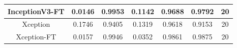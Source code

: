 \documentclass[11pt,a4paper]{article}
\theoremstyle{definition}
\begin{document}
\begin{table}[H]
\begin{tabular}{|c|c|c|c|c|c|c|}
\hline
InceptionV3-FT                                      & \textcolor[rgb]{0.129,0.129,0.129}{0.0146 } & \textcolor[rgb]{0.129,0.129,0.129}{0.9953 } & \textcolor[rgb]{0.129,0.129,0.129}{0.1142 }                                                                       & \textcolor[rgb]{0.129,0.129,0.129}{0.9688}                                                                             & \textcolor[rgb]{0.129,0.129,0.129}{0.9792}                                                                       & 20                                                                                                              \\
\hline
Xception                                            & \textcolor[rgb]{0.129,0.129,0.129}{0.1746 } & \textcolor[rgb]{0.129,0.129,0.129}{0.9405 } & \textcolor[rgb]{0.129,0.129,0.129}{0.1319 }                                                                       & \textcolor[rgb]{0.129,0.129,0.129}{0.9618}                                                                             & \textcolor[rgb]{0.129,0.129,0.129}{0.9153}                                                                       & 20                                                                                                              \\
\hline
\rowcolor{green} Xception-FT                        & \textcolor[rgb]{0.129,0.129,0.129}{0.0157 } & \textcolor[rgb]{0.129,0.129,0.129}{0.9946 } & \textcolor[rgb]{0.129,0.129,0.129}{0.0352 }                                                                       & \textcolor[rgb]{0.129,0.129,0.129}{0.9861}                                                                             & \textcolor[rgb]{0.129,0.129,0.129}{0.9875}                                                                       & 20                                                                                                              \\
\hline
\end{tabular}
\end{table}
\end{document}
